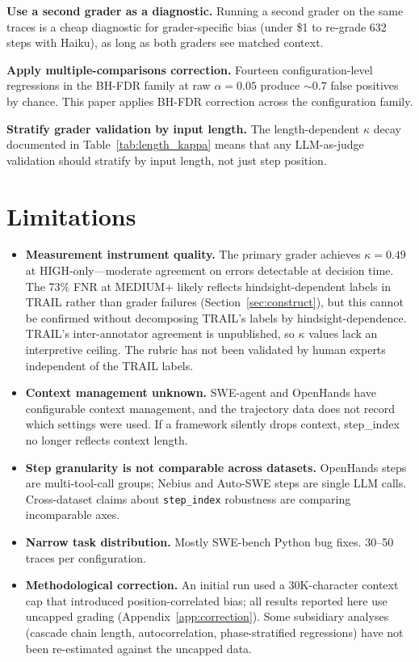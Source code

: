 \documentclass[11pt]{article}
\begin{document}
\textbf{Use a second grader as a diagnostic.}
Running a second grader on the same traces is a cheap diagnostic for grader-specific bias (under \$1 to re-grade 632 steps with Haiku), as long as both graders see matched context.

\textbf{Apply multiple-comparisons correction.}
Fourteen configuration-level regressions in the BH-FDR family at raw $\alpha = 0.05$ produce ${\sim}0.7$ false positives by chance.
This paper applies BH-FDR correction across the configuration family.

\textbf{Stratify grader validation by input length.}
The length-dependent $\kappa$ decay documented in Table~\ref{tab:length_kappa} means that any LLM-as-judge validation should stratify by input length, not just step position.

\section{Limitations}

\begin{itemize}
    \item \textbf{Measurement instrument quality.} The primary grader achieves $\kappa = 0.49$ at HIGH-only---moderate agreement on errors detectable at decision time. The 73\% FNR at MEDIUM+ likely reflects hindsight-dependent labels in TRAIL rather than grader failures (Section~\ref{sec:construct}), but this cannot be confirmed without decomposing TRAIL's labels by hindsight-dependence. TRAIL's inter-annotator agreement is unpublished, so $\kappa$ values lack an interpretive ceiling. The rubric has not been validated by human experts independent of the TRAIL labels.
    \item \textbf{Context management unknown.} SWE-agent and OpenHands have configurable context management, and the trajectory data does not record which settings were used. If a framework silently drops context, step\_index no longer reflects context length.
    \item \textbf{Step granularity is not comparable across datasets.} OpenHands steps are multi-tool-call groups; Nebius and Auto-SWE steps are single LLM calls. Cross-dataset claims about \texttt{step\_index} robustness are comparing incomparable axes.
    \item \textbf{Narrow task distribution.} Mostly SWE-bench Python bug fixes. 30--50 traces per configuration.
    \item \textbf{Methodological correction.} An initial run used a 30K-character context cap that introduced position-correlated bias; all results reported here use uncapped grading (Appendix~\ref{app:correction}). Some subsidiary analyses (cascade chain length, autocorrelation, phase-stratified regressions) have not been re-estimated against the uncapped data.
\end{itemize}
\end{document}
